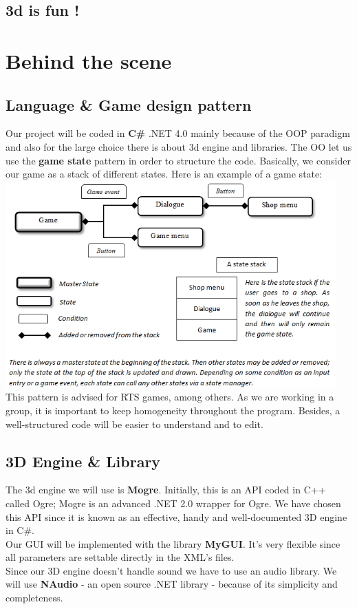 \documentclass[article]{report} %
\begin{document}
						\section{3d is fun !}
					
				\chapter{Behind the scene}
     				\section{Language \& Game design pattern}
     						Our project will be coded in \textbf{C\#} .NET 4.0 mainly because of the \ac{OOP} paradigm and also for the large choice there is about 3d engine and libraries. The OO let us use the \textbf{game state} pattern in order to structure the code. Basically, we consider our game as a stack of different states. Here is an example of a game state:\newline
     						\includegraphics[height=300px]{Images/GameStateDesign.png}\\
     						
     						This pattern is advised for \ac{RTS} games, among others. As we are working in a group, it is important to keep homogeneity throughout the program. Besides, a well-structured code will be easier to understand and to edit.
						\section{3D Engine \& Library}
						The 3d engine we will use is \textbf{\ac{Mogre}}. Initially, this is an \ac{API} coded in C++ called Ogre; Mogre is an advanced .NET 2.0 wrapper for Ogre. We have chosen this \ac{API} since it is known as an effective, handy and well-documented 3D engine in C\#.\\			
						Our \ac{GUI} will be implemented with the library \textbf{\ac{MyGUI}}. It’s very flexible since all parameters are settable directly in the XML’s files.\\	
						Since our 3D engine doesn’t handle sound we have to use an audio library. We will use \textbf{NAudio} - an open source .NET library - because of its simplicity and completeness.
\end{document}
